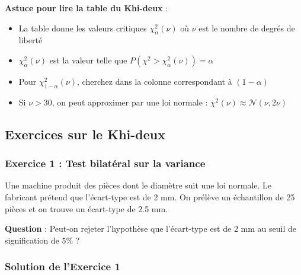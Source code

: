 \documentclass[11pt,a4paper]{article}
\newcommand{\N}{\mathcal{N}}
\newcommand{\chideux}{\chi^2}
\begin{document}
\begin{astucebox}
\textbf{Astuce pour lire la table du Khi-deux} :
\begin{itemize}
    \item La table donne les valeurs critiques $\chideux_{\alpha}(\nu)$ où $\nu$ est le nombre de degrés de liberté
    \item $\chideux_{\alpha}(\nu)$ est la valeur telle que $P(\chideux > \chideux_{\alpha}(\nu)) = \alpha$
    \item Pour $\chideux_{1-\alpha}(\nu)$, cherchez dans la colonne correspondant à $(1-\alpha)$
    \item Si $\nu > 30$, on peut approximer par une loi normale : $\chideux(\nu) \approx \N(\nu, 2\nu)$
\end{itemize}
\end{astucebox}

\newpage

\subsection{Exercices sur le Khi-deux}

\subsubsection{Exercice 1 : Test bilatéral sur la variance}

Une machine produit des pièces dont le diamètre suit une loi normale. Le fabricant prétend que l'écart-type est de 2 mm. On prélève un échantillon de 25 pièces et on trouve un écart-type de 2.5 mm.

\textbf{Question} : Peut-on rejeter l'hypothèse que l'écart-type est de 2 mm au seuil de signification de 5\% ?

\subsubsection*{Solution de l'Exercice 1}
\end{document}
